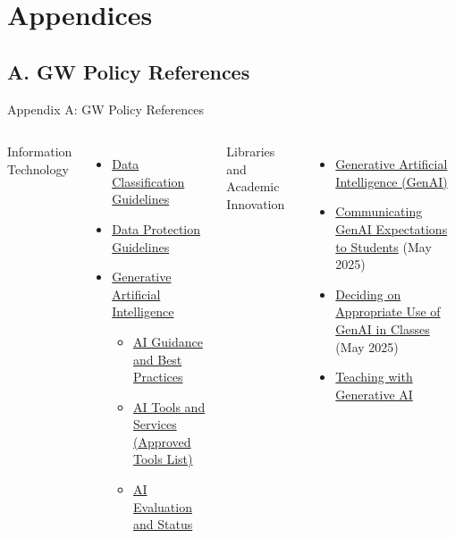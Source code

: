 \documentclass[aspectratio=169]{beamer}
\begin{document}
\section{Appendices}

\subsection{A. GW Policy References}

\begin{frame}[t, allowframebreaks]{Appendix A: GW Policy References}\label{gw_policies}

\tiny

\begin{columns}


Information Technology
\begin{itemize}
    \item \href{https://it.gwu.edu/data-classification-guide}{Data Classification Guidelines}
    \item \href{https://it.gwu.edu/data-protection-guide}{Data Protection Guidelines}
    \vspace{-5pt}
    \item \href{https://it.gwu.edu/gen-ai}{Generative Artificial Intelligence}
    \begin{itemize}\tiny
        \item \href{https://it.gwu.edu/ai-guidance-and-best-practices}{AI Guidance and Best Practices}
        \item \href{https://tinyurl.com/3zvh5b47}{AI Tools and Services (Approved Tools List)}
        \item \href{https://it.gwu.edu/ai-tools-status}{AI Evaluation and Status}\\
    \end{itemize}
\end{itemize}

Libraries and Academic Innovation
\begin{itemize}
    \item \href{https://library.gwu.edu/generative-ai}{Generative Artificial Intelligence (GenAI)}
    \item \href{https://library.gwu.edu/communicating-your-genai-expectations-your-students}{Communicating GenAI Expectations to Students} (May 2025)
    \item \href{https://library.gwu.edu/deciding-appropriate-use-genai-academic-classes}{Deciding on Appropriate Use of GenAI in Classes} (May 2025)
    \item \href{https://library.gwu.edu/teaching-generative-ai}{Teaching with Generative AI}
\end{itemize}


\end{columns}
\end{frame}
\end{document}
